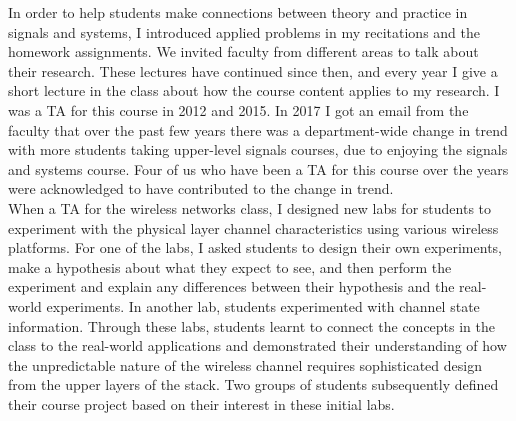 \documentclass[10pt]{article}
\begin{document}

In order to help students make connections between theory and practice in signals and systems,  %
I introduced applied problems in my recitations and the homework assignments. We invited faculty from different areas to talk about their research. These lectures have continued since then, and every year I give a short lecture in the class about how the course content applies to my research.  I was a TA for this course in 2012 and 2015. In 2017 I got an email from the faculty that over the past few years there was a department-wide change in trend with more students taking upper-level signals courses, due to enjoying the signals and systems course. Four of us who have been a TA for this course over the years were acknowledged to have contributed to the change in trend. \\

When a TA for the wireless networks class, I designed new labs for students to experiment with the physical layer channel characteristics using various wireless platforms. 
For one of the labs, I asked students to design their own experiments, make a hypothesis about what they expect to see, and then perform the experiment and explain any differences between their hypothesis and the real-world experiments. In another lab, students experimented with channel state information. Through these labs, students learnt to connect the concepts in the class to the real-world applications and demonstrated their understanding of how the unpredictable nature of the wireless channel requires sophisticated design from the upper layers of the stack. Two groups of students subsequently defined their course project based on their interest in these initial labs. \\ %

\end{document}
